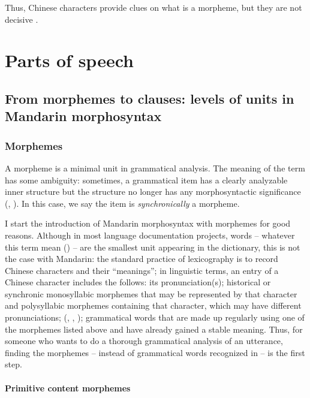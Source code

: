 \documentclass[UTF8, a4paper, oneside, scheme=plain]{ctexrep}
\begin{document}
Thus, Chinese characters provide clues on what is a morpheme,
but they are not decisive \citep[1.1.4]{zhudexigrammar}.

\chapter{Parts of speech}

\section{From morphemes to clauses: levels of units in Mandarin morphosyntax}

\subsection{Morphemes}\label{sec:pos.morpheme}

A morpheme is a minimal unit in grammatical analysis.
The meaning of the term has some ambiguity:
sometimes, a grammatical item has a clearly analyzable inner structure 
but the structure no longer has any morphosyntactic significance
(, ).
In this case, we say the item is \emph{synchronically} a morpheme.

I start the introduction of Mandarin morphosyntax 
with morphemes for good reasons. 
Although in most language documentation projects, 
words -- whatever this term mean () -- 
are the smallest unit appearing in the dictionary, 
this is not the case with Mandarin:
the standard practice of lexicography 
is to record Chinese characters and their ``meanings''; 
in linguistic terms, 
an entry of a Chinese character includes the follows:
its pronunciation(s); 
historical or synchronic monosyllabic morphemes that may be represented by that character
and polysyllabic morphemes containing that character,
which may have different pronunciations;
(,
,
); 
grammatical words that are made up regularly using one of the morphemes listed above
and have already gained a stable meaning.
Thus, for someone who wants to do a thorough grammatical analysis 
of an utterance, 
finding the morphemes -- instead of grammatical words recognized in  -- 
is the first step.

\subsubsection{Primitive content morphemes}\label{sec:pos.morpheme.primitive}
\end{document}
